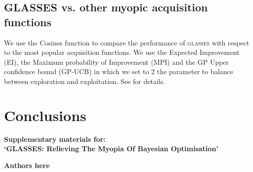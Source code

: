 \documentclass[twoside]{article}
\newcommand{\acr}[1]{\textsc{#1}\xspace}
\newcommand{\us}{\acr{glasses}}
\begin{document}

\subsection{GLASSES vs. other myopic acquisition functions}
We use the Cosines function to compare the performance of \us with respect to the most popular acquisition functions. We use the Expected Improvement (EI), the Maximum probability of Improvement (MPI) and the GP Upper confidence bound (GP-UCB) in which we set to 2 the parameter to balance between exploration and exploitation. See \citep{} for details. 


\section{Conclusions}\label{sec:conclusions}

\newpage
\newpage
\newpage



\newpage
\clearpage
\setcounter{section}{0}
\setcounter{equation}{0}
\renewcommand{\thesection}{S\arabic{section}}
\renewcommand{\theequation}{S.\arabic{equation}}
\onecolumn
\begin{center}
{\Large  \textbf{Supplementary materials for:\\
`GLASSES: Relieving The Myopia Of Bayesian Optimisation'}}
\end{center}
\begin{center}
\textbf{Authors here}
\end{center}
\end{document}
